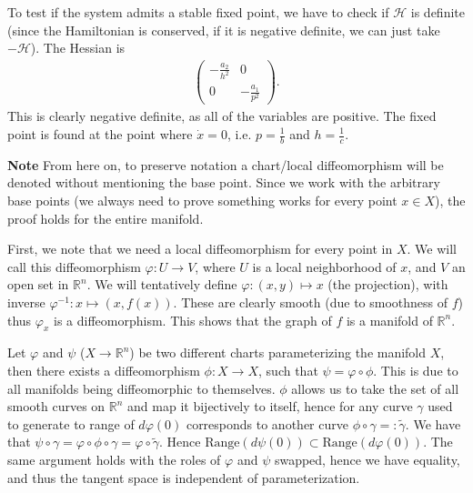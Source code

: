 \begin{solution}[8.7]
To test if the system admits a stable fixed point, we have to check if $\mathcal{H}$ is definite (since the Hamiltonian is conserved, if it is negative definite, we can just take $-\mathcal{H}$). The Hessian is
\begin{align}
\begin{pmatrix}
	-\frac{a_2}{h^2} & 0 \\
	0 & - \frac{a_1}{p^2}
\end{pmatrix}
.\end{align}
This is clearly negative definite, as all of the variables are positive. The fixed point is found at the point where $ \dot{x}=0$, i.e. $p=\frac{1}{b}$ and $h=\frac{1}{c}$.
\end{solution}

\textbf{Note} From here on, to preserve notation a chart/local diffeomorphism will be denoted without mentioning the base point. Since we work with the arbitrary base points (we always need to prove something works for every point $x\in X$), the proof holds for the entire manifold.

\begin{solution}[9.1]
First, we note that we need a local diffeomorphism for every point in $X$. We will call this diffeomorphism $\varphi: U \to V$, where $U$ is a local neighborhood of $x$, and $V$ an open set in $\mathbb{R}^n$. We will tentatively define $\varphi: (x,y) \mapsto x$ (the projection), with inverse $\varphi^{-1}: x \mapsto (x, f(x))$. These are clearly smooth (due to smoothness of $f $) thus $\varphi_x$ is a diffeomorphism. This shows that the graph of $f$ is a manifold of $\mathbb{R}^n$.
\end{solution}

\begin{solution}[9.2]
Let $\varphi$ and $\psi$ ($X\to \mathbb{R}^n$) be two different charts parameterizing the manifold $X$, then there exists a diffeomorphism $\phi : X \to X$, such that $\psi =\varphi \circ \phi$. This is due to all manifolds being diffeomorphic to themselves. $\phi$ allows us to take the set of all smooth curves on $\mathbb{R}^n$ and map it bijectively to itself, hence for any curve $\gamma$ used to generate to range of $d\varphi(0)$ corresponds to another curve $\phi \circ \gamma =: \tilde{\gamma}$. We have that $\psi \circ \gamma = \varphi \circ \phi \circ \gamma = \varphi \circ \tilde{\gamma}$. Hence $ \textrm{Range}(d\psi(0)) \subset  \textrm{Range}(d\varphi(0)) $. The same argument holds with the roles of $\varphi$ and $\psi$ swapped, hence we have equality, and thus the tangent space is independent of parameterization.
\end{solution}

